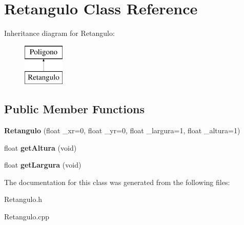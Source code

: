 \hypertarget{classRetangulo}{}\section{Retangulo Class Reference}
\label{classRetangulo}
Inheritance diagram for Retangulo\+:\begin{figure}[H]
\begin{center}
\leavevmode
\includegraphics[height=2.000000cm]{classRetangulo}
\end{center}
\end{figure}
\subsection*{Public Member Functions}
\begin{DoxyCompactItemize}
\item 
\mbox{\label{classRetangulo_a7bb0f3ead5f9b7610f3c7187a5a8c002}} 
{\bfseries Retangulo} (float \+\_\+xr=0, float \+\_\+yr=0, float \+\_\+largura=1, float \+\_\+altura=1)
\item 
\mbox{\label{classRetangulo_a9c332035e5f045f98b3da1549172acd4}} 
float {\bfseries get\+Altura} (void)
\item 
\mbox{\label{classRetangulo_a13f129bc990f54e6fba908cca70b2116}} 
float {\bfseries get\+Largura} (void)
\end{DoxyCompactItemize}


The documentation for this class was generated from the following files\+:\begin{DoxyCompactItemize}
\item 
Retangulo.\+h\item 
Retangulo.\+cpp\end{DoxyCompactItemize}
